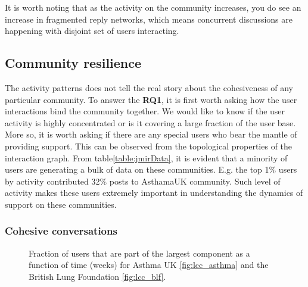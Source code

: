 \begin{remark}
    It is worth noting that as the activity on the community increases, you do see an increase in fragmented reply networks, which means concurrent discussions are happening with disjoint set of users interacting. 
\end{remark}



\subsection{Community resilience}
\label{sec:resilience}
The activity patterns does not tell the real story about the cohesiveness of any particular community. To answer the \textbf{RQ1}, it is first worth asking how the user interactions bind the community together. We would like to know if the user activity is highly concentrated or is it covering a large fraction of the user base. More so, it is worth asking if there are any special users who bear the mantle of providing support. This can be observed from the topological properties of the interaction graph. 
From table\ref{table:jmirData}, it is evident that a minority of users are generating a bulk of data on these communities. E.g. the top 1\% users by activity contributed 32\% posts to AsthamaUK community. Such level of activity makes these users extremely important in understanding the dynamics of support on these communities. 

\subsubsection{Cohesive conversations}

\begin{figure}[!ht]
    \centering
    
    \caption{Fraction of users that are part of the largest component as a function of time (weeks) for Asthma UK \ref{fig:lcc_asthma} and the British Lung Foundation \ref{fig:lcc_blf}.}
\end{figure}


